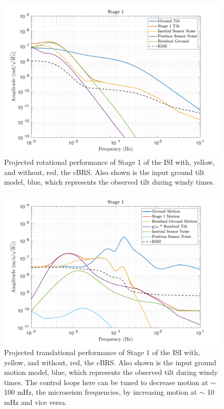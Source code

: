 \documentclass [12pt, proquest]{uwthesis}[2019]
\begin{document}
\begin{figure}%
\begin{center}
\includegraphics[width=\textwidth]{cBRS_Model_ST1RX.pdf}
\caption{Projected rotational performance of Stage 1 of the ISI with, yellow, and without, red, the cBRS. Also shown is the input ground tilt model, blue, which represents the observed tilt during windy times.}
\label{cBRS2R}
\end{center}
\end{figure}

\begin{figure}%
\begin{center}
\includegraphics[width=\textwidth]{cBRS_Model_ST1X.pdf}
\caption{Projected translational performance of Stage 1 of the ISI with, yellow, and without, red, the cBRS. Also shown is the input ground motion model, blue, which represents the observed tilt during windy times. The control loops here can be tuned to decrease motion at $\sim$ 100 mHz, the microseism frequencies, by increasing motion at $\sim$ 10 mHz and vice versa.}
\label{cBRS2X}
\end{center}
\end{figure}
\end{document}
